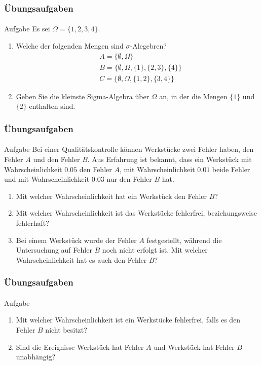 \documentclass{beamer}
\begin{document}
\begin{frame}
    \frametitle{Übungsaufgaben}
\framesubtitle{}
\begin{block}{Aufgabe}
Es sei $\Omega = \{ 1,2,3,4\}$. 
\begin{enumerate}
\item Welche der folgenden Mengen sind $\sigma$-Alegebren?
\begin{align*}
& A =  \{ \emptyset,  \Omega  \} \\
& B=  \{ \emptyset,  \Omega , \{ 1\}, \{ 2,3\}, \{ 4\} \}  \\
& C=  \{ \emptyset,  \Omega ,  \{ 1,2\}, \{ 3, 4\} \}  
\end{align*}
\item Geben Sie die kleinste Sigma-Algebra über $\Omega$ an, in der die Mengen $ \{ 1\}$ und $ \{ 2\}$ enthalten sind.
\end{enumerate}
\end{block}

 \end{frame}




\begin{frame}
    \frametitle{Übungsaufgaben}
\framesubtitle{}
\begin{block}{Aufgabe}
Bei einer Qualitätskontrolle können Werkstücke zwei Fehler haben, den Fehler $A$ und den Fehler $B$. Aus Erfahrung ist bekannt, dass ein Werkstück mit Wahrscheinlichkeit $0.05$  den Fehler $A$, mit Wahrscheinlichkeit $0.01$ beide Fehler und mit  Wahrscheinlichkeit $0.03$ nur den Fehler $B$ hat.
\begin{enumerate}
\item Mit welcher Wahrscheinlichkeit hat ein Werkstück den Fehler $B$?
\item Mit welcher Wahrscheinlichkeit ist das Werkstücke fehlerfrei, beziehungsweise fehlerhaft?
\item Bei einem Werkstück wurde der Fehler $A$ festgestellt, während die Untersuchung auf Fehler $B$ noch nicht erfolgt ist. Mit welcher Wahrscheinlichkeit hat es auch den Fehler $B$?
\end{enumerate}
\end{block}
 \end{frame}

\begin{frame}
    \frametitle{Übungsaufgaben}
\framesubtitle{}
\begin{block}{Aufgabe}
\begin{enumerate}
\item Mit welcher Wahrscheinlichkeit ist ein Werkstücke fehlerfrei, falls es den Fehler $B$ nicht besitzt?
\item Sind die Ereignisse Werkstück hat Fehler $A$ und Werkstück hat Fehler $B$ unabhängig?
\end{enumerate}
\end{block}
 \end{frame}
\end{document}
